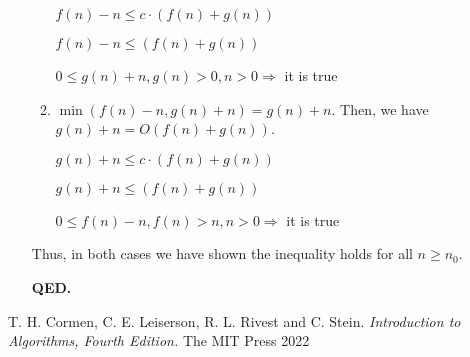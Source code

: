 \documentclass{article}
\begin{document}
\begin{enumerate}
\begin{enumerate}
        $f(n) - n \leq c \cdot (f(n) + g(n))$
        
        $f(n) - n \leq (f(n) + g(n))$
        
        $0 \leq g(n) + n, g(n) > 0, n > 0 \Rightarrow$ it is true

        \item $\min(f(n) - n, g(n) + n) = g(n) + n$. Then, we have $g(n) + n = O(f(n) + g(n))$.
        
        $g(n) + n \leq c \cdot (f(n) + g(n))$
        
        $g(n) + n \leq (f(n) + g(n))$
        
        $0 \leq f(n) - n, f(n) > n, n > 0 \Rightarrow$ it is true
    \end{enumerate}
    Thus, in both cases we have shown the inequality holds for all $n \geq n_0$.
    
    \textbf{QED.}
\end{enumerate}

\begin{thebibliography}{9}
  T. H. Cormen, C. E. Leiserson, R. L. Rivest and C. Stein.
  \textit{Introduction to Algorithms, Fourth Edition.}
  The MIT Press
  2022
\end{thebibliography}
\end{document}
